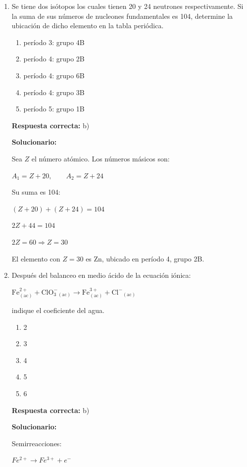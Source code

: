 \begin{enumerate}[resume]
	
	\item Se tiene dos isótopos los cuales tienen 20 y 24 neutrones respectivamente. Si la suma de sus números de nucleones fundamentales es 104, determine la ubicación de dicho elemento en la tabla periódica.
	\begin{enumerate}[label=\alph*)]
		\item período 3: grupo 4B
		\item período 4: grupo 2B
		\item período 4: grupo 6B
		\item período 4: grupo 3B
		\item período 5: grupo 1B
	\end{enumerate}
	\textbf{Respuesta correcta:} b)
	
	\vspace{2mm}
	\textbf{Solucionario:}
	
	Sea $Z$ el número atómico. Los números másicos son:
	
	$A_1=Z+20,\qquad A_2=Z+24$
	
	Su suma es 104:
	
	$(Z+20)+(Z+24)=104$
	
	$2Z+44=104$
	
	$2Z=60 \Rightarrow Z=30$
	
	El elemento con $Z=30$ es Zn, ubicado en período 4, grupo 2B.
	
	\vspace{6mm}
	
	\item Después del balanceo en medio ácido de la ecuación iónica:
	
	$\mathrm{Fe^{2+}_{(ac)}+ClO_3^-{}_{(ac)}\rightarrow Fe^{3+}_{(ac)}+Cl^-{}_{(ac)}}$
	
	indique el coeficiente del agua.
	\begin{enumerate}[label=\alph*)]
		\item 2
		\item 3
		\item 4
		\item 5
		\item 6
	\end{enumerate}
	\textbf{Respuesta correcta:} b)
	
	\vspace{2mm}
	\textbf{Solucionario:}
	
	Semirreacciones:
	
	$Fe^{2+}\rightarrow Fe^{3+}+e^-$
	

\end{enumerate}
